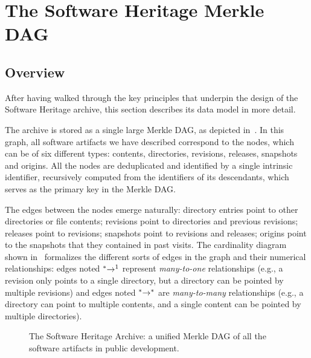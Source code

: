 \section{The Software Heritage Merkle DAG}

\subsection{Overview}

After having walked through the key principles that underpin the design of the
Software Heritage archive, this section describes its data model in more
detail.

The archive is stored as a single large Merkle \gls{DAG}, as depicted
in~. In this graph, all software artifacts we have
described correspond to the nodes, which can be of six different types:
contents, directories, revisions, releases, snapshots and origins.
All the nodes are deduplicated and identified by a single intrinsic
identifier, recursively computed from the identifiers of its descendants, which
serves as the primary key in the Merkle \gls{DAG}.

The edges between the nodes emerge naturally: directory entries point to other
directories or file contents; revisions point to directories and previous
revisions; releases point to revisions; snapshots point to revisions and
releases; origins point to the snapshots that they contained in past visits.
The cardinality diagram shown in~ formalizes the
different sorts of edges in the graph and their numerical relationships: edges
noted $\prescript{\ast}{}\rightarrow^1$ represent \emph{many-to-one}
relationships (e.g., a revision only points to a single directory, but a
directory can be pointed by multiple revisions) and edges noted
$\prescript{\ast}{}\rightarrow^\ast$ are \emph{many-to-many} relationships
(e.g., a directory can point to multiple contents, and a single content can be
pointed by multiple directories).

\begin{figure}
    \centering
    
    \caption{The Software Heritage Archive: a unified Merkle \gls{DAG} of all
    the software artifacts in public development.}%
    \label{fig:swh-model}
\end{figure}

